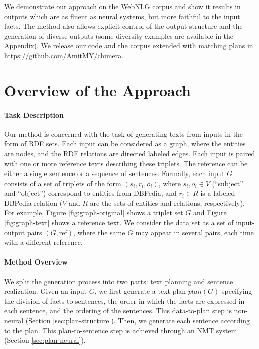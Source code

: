 \documentclass[11pt,a4paper]{article}
\begin{document}
We demonstrate our approach on the WebNLG corpus and show it results in outputs which are as fluent as neural systems, but more faithful to the input facts. 
The method also allows explicit control of the output structure and the generation of diverse outputs (some diversity examples are available in the Appendix).
We release our code and the corpus extended with matching plans in \url{https://github.com/AmitMY/chimera}.

\section{Overview of the Approach}\label{sec:preliminaries}
\paragraph{Task Description}
Our method is concerned with the task of generating texts from inputs in the form of RDF sets. Each input can be considered as a graph, where the entities are nodes, and the RDF relations are directed labeled edges. 
Each input is paired with one or more reference texts describing these triplets. The reference can be either a single sentence or a sequence of sentences. 
Formally, each input $G$ consists of a set of triplets of the form $(s_i,r_i,o_i)$, where $s_i,o_i \in V$ (``subject'' and ``object'') correspond to entities from DBPedia, and $r_i \in R$ is a labeled DBPedia relation ($V$ and $R$ are the sets of entities and relations, respectively). 
For example, Figure \ref{fig:graph-original} shows a triplet set $G$ and Figure \ref{fig:graph-text} shows a reference text.
We consider the data set as a set of input-output pairs $(G,\text{ref})$, where the same $G$ may appear in several pairs, each time with a different reference.

\paragraph{Method Overview}
We split the generation process into two parts: text planning and sentence realization. Given an input $G$, we first generate a text plan $plan(G)$ specifying the division of facts to sentences, the order in which the facts are expressed in each sentence, and the ordering of the sentences. This data-to-plan step is non-neural (Section \ref{sec:plan-structure}).
Then, we generate each sentence according to the plan. This plan-to-sentence step is achieved through an NMT system (Section \ref{sec:plan-neural}). 
\end{document}
